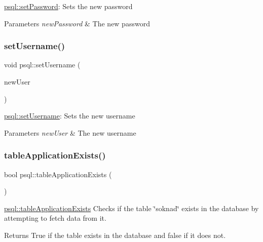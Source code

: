 \mbox{\hyperlink{classpsql_a6c29350037550b7e5a5bb8f439c405f3}{psql\+::set\+Password}}\+: Sets the new password 


\begin{DoxyParams}{Parameters}
{\em new\+Password} & The new password \\
\hline
\end{DoxyParams}
\mbox{\label{classpsql_a1488a9e4909abd172651b7be240342cb}} 
\subsubsection{\texorpdfstring{set\+Username()}{setUsername()}}
{\footnotesize\ttfamily void psql\+::set\+Username (\begin{DoxyParamCaption}\item[{Q\+String}]{new\+User }\end{DoxyParamCaption})}



\mbox{\hyperlink{classpsql_a1488a9e4909abd172651b7be240342cb}{psql\+::set\+Username}}\+: Sets the new username 


\begin{DoxyParams}{Parameters}
{\em new\+User} & The new username \\
\hline
\end{DoxyParams}
\mbox{\label{classpsql_a117b616053845f1b7295b21a06f008fd}} 
\subsubsection{\texorpdfstring{table\+Application\+Exists()}{tableApplicationExists()}}
{\footnotesize\ttfamily bool psql\+::table\+Application\+Exists (\begin{DoxyParamCaption}{ }\end{DoxyParamCaption})}



\mbox{\hyperlink{classpsql_a117b616053845f1b7295b21a06f008fd}{psql\+::table\+Application\+Exists}} Checks if the table \char`\"{}soknad\char`\"{} exists in the database by attempting to fetch data from it. 

\begin{DoxyReturn}{Returns}
True if the table exists in the database and false if it does not. 
\end{DoxyReturn}
\mbox{\label{classpsql_ae0ab0012c58471bd3fd63c286fb22224}} 
